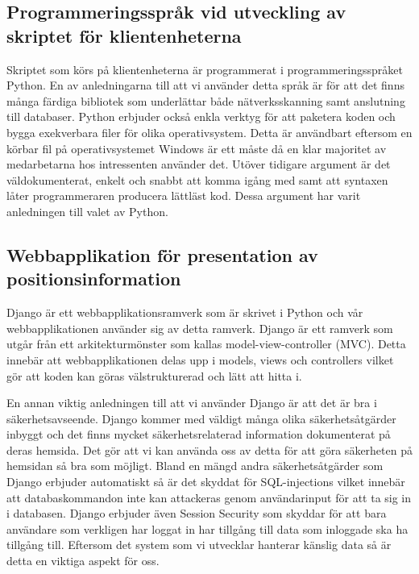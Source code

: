 \documentclass[a4paper,12pt]{article}
\begin{document}
 \subsection{Programmeringsspråk vid utveckling av skriptet för klientenheterna}
 Skriptet som körs på klientenheterna är programmerat i programmeringsspråket Python. En av anledningarna till att vi använder detta språk är för att det finns många färdiga bibliotek som underlättar både nätverksskanning samt anslutning till databaser\cite{python}. Python erbjuder också enkla verktyg för att paketera koden och bygga exekverbara filer för olika operativsystem. Detta är användbart eftersom en körbar fil på operativsystemet Windows är ett måste då en klar majoritet av medarbetarna hos intressenten använder det. Utöver tidigare argument är det väldokumenterat, enkelt och snabbt att komma igång med samt att syntaxen låter programmeraren producera lättläst kod. Dessa argument har varit anledningen till valet av Python.

 \subsection{Webbapplikation för presentation av positionsinformation}\label{django}
 Django är ett webbapplikationsramverk som är skrivet i Python och vår webbapplikationen använder sig av detta ramverk. Django är ett ramverk som utgår från ett arkitekturmönster som kallas model-view-controller (MVC)\cite{djangoMVC}. Detta innebär att webbapplikationen delas upp i models, views och controllers vilket gör att koden kan göras välstrukturerad och lätt att hitta i.


 En annan viktig anledningen till att vi använder Django är att det är bra i säkerhetsavseende. Django kommer med väldigt många olika säkerhetsåtgärder inbyggt och det finns mycket säkerhetsrelaterad information dokumenterat på deras hemsida\cite{securityInDjango}. Det gör att vi kan använda oss av detta för att göra säkerheten på hemsidan så bra som möjligt. Bland en mängd andra säkerhetsåtgärder som Django erbjuder automatiskt så är det skyddat för SQL-injections \cite{securityInDjango} vilket innebär att databaskommandon inte kan attackeras genom användarinput för att ta sig in i databasen. Django erbjuder även Session Security \cite{securityInDjango} som skyddar för att bara användare som verkligen har loggat in har tillgång till data som inloggade ska ha tillgång till.
 Eftersom det system som vi utvecklar hanterar känslig data så är detta en viktiga aspekt för oss.
\end{document}
